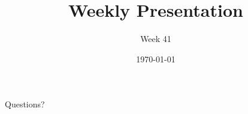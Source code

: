\documentclass{beamer}
\title{Weekly Presentation}
\subtitle{Week 41}
\author{}
\institute{Luleå University of Technology}
\date{\today}
\begin{document}
\begin{frame}
    \titlepage
\end{frame}





\begin{frame}
    \begin{center}
        \Huge Questions?
    \end{center}
\end{frame}
\end{document}
